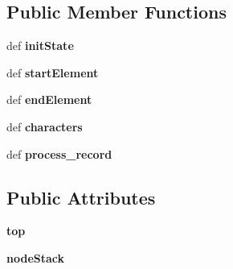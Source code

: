 \subsection*{Public Member Functions}
\begin{DoxyCompactItemize}
\item 
\hypertarget{classcheshire3_1_1web_1_1transformer_1_1_g_r_s1_transformer_a4331901a7281ea5e1ae4f8998c4411e9}{def {\bfseries init\-State}}\label{classcheshire3_1_1web_1_1transformer_1_1_g_r_s1_transformer_a4331901a7281ea5e1ae4f8998c4411e9}

\item 
\hypertarget{classcheshire3_1_1web_1_1transformer_1_1_g_r_s1_transformer_a07ec199a1f298ab8bd494921ea62efe2}{def {\bfseries start\-Element}}\label{classcheshire3_1_1web_1_1transformer_1_1_g_r_s1_transformer_a07ec199a1f298ab8bd494921ea62efe2}

\item 
\hypertarget{classcheshire3_1_1web_1_1transformer_1_1_g_r_s1_transformer_a0f0cfb65386de90d7caf5694a919cf4e}{def {\bfseries end\-Element}}\label{classcheshire3_1_1web_1_1transformer_1_1_g_r_s1_transformer_a0f0cfb65386de90d7caf5694a919cf4e}

\item 
\hypertarget{classcheshire3_1_1web_1_1transformer_1_1_g_r_s1_transformer_aab464b02a5f0f2d6faa49488f198d735}{def {\bfseries characters}}\label{classcheshire3_1_1web_1_1transformer_1_1_g_r_s1_transformer_aab464b02a5f0f2d6faa49488f198d735}

\item 
\hypertarget{classcheshire3_1_1web_1_1transformer_1_1_g_r_s1_transformer_ab77c60a73f853df05d980140989bbd2f}{def {\bfseries process\-\_\-record}}\label{classcheshire3_1_1web_1_1transformer_1_1_g_r_s1_transformer_ab77c60a73f853df05d980140989bbd2f}

\end{DoxyCompactItemize}
\subsection*{Public Attributes}
\begin{DoxyCompactItemize}
\item 
\hypertarget{classcheshire3_1_1web_1_1transformer_1_1_g_r_s1_transformer_a622eebf501b87f6cb7c454d84355a225}{{\bfseries top}}\label{classcheshire3_1_1web_1_1transformer_1_1_g_r_s1_transformer_a622eebf501b87f6cb7c454d84355a225}

\item 
\hypertarget{classcheshire3_1_1web_1_1transformer_1_1_g_r_s1_transformer_a82df30789f96b74d63681d513cea8824}{{\bfseries node\-Stack}}\label{classcheshire3_1_1web_1_1transformer_1_1_g_r_s1_transformer_a82df30789f96b74d63681d513cea8824}

\end{DoxyCompactItemize}
